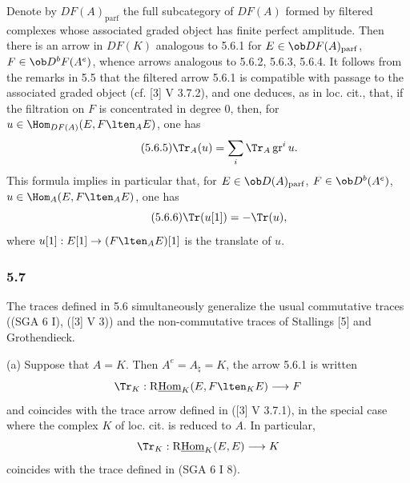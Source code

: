 Denote by $DF(A)_{\mathrm{parf}}$ the full subcategory of $DF(A)$ formed by filtered complexes whose associated graded object has finite perfect amplitude. Then there is an arrow in $DF(K)$ analogous to 5.6.1 for $E\in\ob DF(A)_{\mathrm{parf}}$, $F\in\ob D^bF(A^e)$, whence arrows analogous to 5.6.2, 5.6.3, 5.6.4. It follows from the remarks in 5.5 that the filtered arrow 5.6.1 is compatible with passage to the associated graded object (cf. [3] V 3.7.2), and one deduces, as in loc. cit., that, if the filtration on $F$ is concentrated in degree $0$, then, for $u\in\Hom_{DF(A)}(E,F\lten_AE)$, one has
\begin{equation}\tag{5.6.5}
\Tr_A(u)=\sum_i\Tr_A\operatorname{gr}^i u.
\end{equation}
This formula implies in particular that, for $E\in\ob D(A)_{\mathrm{parf}}$, $F\in\ob D^b(A^e)$, $u\in\Hom_A(E,F\lten_AE)$, one has
\begin{equation}\tag{5.6.6}
\Tr(u[1])=-\Tr(u),
\end{equation}
where $u[1]:E[1]\to(F\lten_AE)[1]$ is the translate of $u$.

\subsubsection*{5.7}

The traces defined in 5.6 simultaneously generalize the usual commutative traces ((SGA 6 I), ([3] V 3)) and the non-commutative traces of Stallings [5] and Grothendieck.

(a) Suppose that $A=K$. Then $A^e=A_\natural=K$, the arrow 5.6.1 is written
\[
\Tr_K:\mathrm{R}\underline{\mathrm{Hom}}_K(E,F\lten_KE)\longrightarrow F
\]
and coincides with the trace arrow defined in ([3] V 3.7.1), in the special case where the complex $K$ of loc. cit. is reduced to $A$. In particular,
\[
\Tr_K:\mathrm{R}\underline{\mathrm{Hom}}_K(E,E)\longrightarrow K
\]
coincides with the trace defined in (SGA 6 I 8).

